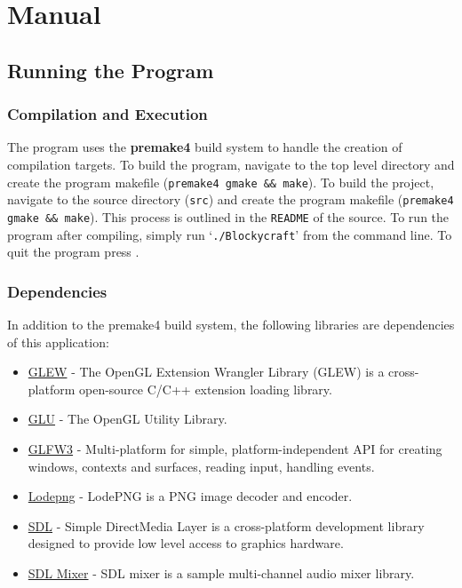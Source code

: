 \documentclass{book}
\begin{document}
\chapter{Manual}
\section{Running the Program}
\subsection{Compilation and Execution}
The program uses the \textbf{premake4} build system to handle the creation of compilation targets.  To build the program, navigate to the top level directory and create the program makefile (\texttt{premake4 gmake \&\& make}).  To build the project, navigate to the source directory (\texttt{src}) and create the program makefile (\texttt{premake4 gmake \&\& make}).
This process is outlined in the \texttt{README} of the source.  To run the program after compiling, simply run `\texttt{./Blockycraft}' from the command line.  To quit the program press .

\subsection{Dependencies}
In addition to the premake4 build system, the following libraries are dependencies of this application: 
\begin{itemize}
	\item \href{https://github.com/nigels-com/glew}{GLEW} - The OpenGL Extension Wrangler Library (GLEW) is a cross-platform open-source C/C++ extension loading library.
	\item \href{https://www.opengl.org/resources/libraries/}{GLU} - The OpenGL Utility Library.
	\item \href{http://www.glfw.org/docs/latest/}{GLFW3} - Multi-platform for simple, platform-independent API for creating windows, contexts and surfaces, reading input, handling events.
	\item \href{http://lodev.org/lodepng/}{Lodepng} - LodePNG is a PNG image decoder and encoder.
	\item \href{https://www.libsdl.org/}{SDL} - Simple DirectMedia Layer is a cross-platform development library designed to provide low level access to graphics hardware.
	\item \href{https://www.libsdl.org/projects/SDL_mixer/}{SDL Mixer} - SDL mixer is a sample multi-channel audio mixer library. 
\end{itemize}
\end{document}
